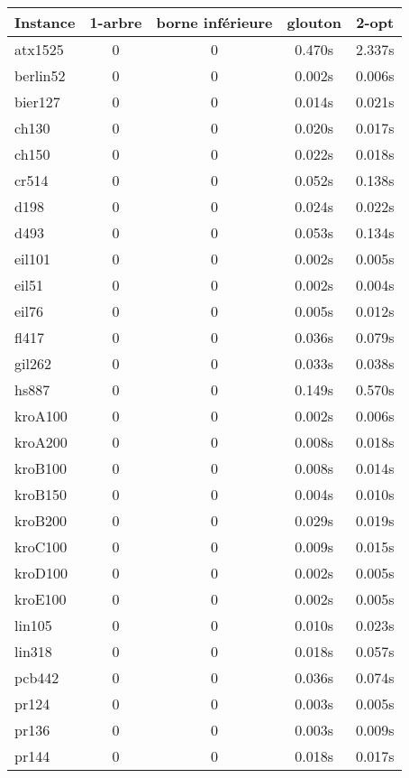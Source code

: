 \begin{longtable}{|l||c|c|c|c|}
  \hline
  Instance & 1-arbre & borne inférieure & glouton & 2-opt\\
  \hline
  \hline
  atx1525 & 0 & 0 & 0.470s & 2.337s \\
  \hline
  berlin52 & 0 & 0 & 0.002s & 0.006s \\
  \hline
  bier127 & 0 & 0 & 0.014s & 0.021s \\
  \hline
  ch130 & 0 & 0 & 0.020s & 0.017s \\
  \hline
  ch150 & 0 & 0 & 0.022s & 0.018s \\
  \hline
  cr514 & 0 & 0 & 0.052s & 0.138s \\
  \hline
  d198 & 0 & 0 & 0.024s & 0.022s \\
  \hline
  d493 & 0 & 0 & 0.053s & 0.134s \\
  \hline
  eil101 & 0 & 0 & 0.002s & 0.005s \\
  \hline
  eil51 & 0 & 0 & 0.002s & 0.004s \\
  \hline
  eil76 & 0 & 0 & 0.005s & 0.012s \\
  \hline
  fl417 & 0 & 0 & 0.036s & 0.079s \\
  \hline
  gil262 & 0 & 0 & 0.033s & 0.038s \\
  \hline
  hs887 & 0 & 0 & 0.149s & 0.570s \\
  \hline
  kroA100 & 0 & 0 & 0.002s & 0.006s \\
  \hline
  kroA200 & 0 & 0 & 0.008s & 0.018s \\
  \hline
  kroB100 & 0 & 0 & 0.008s & 0.014s \\
  \hline
  kroB150 & 0 & 0 & 0.004s & 0.010s \\
  \hline
  kroB200 & 0 & 0 & 0.029s & 0.019s \\
  \hline
  kroC100 & 0 & 0 & 0.009s & 0.015s \\
  \hline
  kroD100 & 0 & 0 & 0.002s & 0.005s \\
  \hline
  kroE100 & 0 & 0 & 0.002s & 0.005s \\
  \hline
  lin105 & 0 & 0 & 0.010s & 0.023s \\
  \hline
  lin318 & 0 & 0 & 0.018s & 0.057s \\
  \hline
  pcb442 & 0 & 0 & 0.036s & 0.074s \\
  \hline
  pr124 & 0 & 0 & 0.003s & 0.005s \\
  \hline
  pr136 & 0 & 0 & 0.003s & 0.009s \\
  \hline
  pr144 & 0 & 0 & 0.018s & 0.017s \\

\end{longtable}
